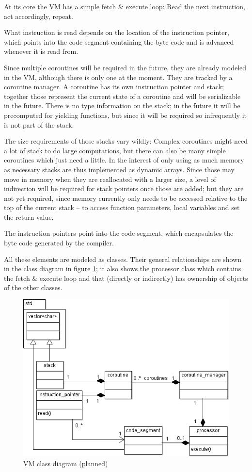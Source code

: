			At its core the VM has a simple fetch \& execute loop: Read the next instruction, act accordingly, repeat.
			
			What instruction is read depends on the location of the instruction pointer, which points into the code segment containing the byte code and is advanced whenever it is read from.
			
			Since multiple coroutines will be required in the future, they are already modeled in the VM, although there is only one at the moment. They are tracked by a coroutine manager. A coroutine has its own instruction pointer and stack; together those represent the current state of a coroutine and will be serializable in the future. There is no type information on the stack; in the future it will be precomputed for yielding functions, but since it will be required so infrequently it is not part of the stack.
			
			The size requirements of those stacks vary wildly: Complex coroutines might need a lot of stack to do large computations, but there can also be many simple coroutines which just need a little. In the interest of only using as much memory as necessary stacks are thus implemented as dynamic arrays. Since those may move in memory when they are reallocated with a larger size, a level of indirection will be required for stack pointers once those are added; but they are not yet required, since memory currently only needs to be accessed relative to the top of the current stack -- to access function parameters, local variables and set the return value.
			
			The instruction pointers point into the code segment, which encapsulates the byte code generated by the compiler.
			
			All these elements are modeled as classes. Their general relationships are shown in the class diagram in figure \ref{fig:vm_class_diagram}; it also shows the processor class which contains the fetch \& execute loop and that (directly or indirectly) has ownership of objects of the other classes.
			
			\begin{figure}
			\centering
			\includegraphics[width=\textwidth]{figures/vm_classes_cropped}
			\caption{VM class diagram (planned)}
			\label{fig:vm_class_diagram}
			\end{figure}

